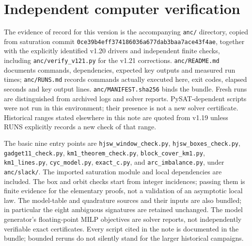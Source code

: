 \documentclass[11pt]{article}
\theoremstyle{remark}
\begin{document}
\section{Independent computer verification}

The evidence of record for this version is the accompanying \texttt{anc/} directory, copied from saturation commit
\texttt{0ce39b4eff374186036a677dab3baa7ace43f4ae}, together with the explicitly identified v1.20 drivers and independent finite checks, including \texttt{anc/verify\_v121.py} for the v1.21 corrections.
\texttt{anc/README.md} documents commands, dependencies, expected key outputs and measured run times;
\texttt{anc/RUNS.md} records commands actually executed here, exit codes, elapsed seconds and key output lines.
\texttt{anc/MANIFEST.sha256} binds the bundle.  Fresh runs are distinguished from archived logs and solver reports.
PySAT-dependent scripts were not run in this environment; their presence is not a new solver certificate.
Historical ranges stated elsewhere in this note are quoted from v1.19 unless RUNS explicitly records a new check of that range.

{\raggedright
The basic nine entry points are \texttt{hjsw\_\allowbreak window\_\allowbreak check.py}, \texttt{hjsw\_\allowbreak boxes\_\allowbreak check.py}, \texttt{gadget11\_check.py},
\texttt{km1\_\allowbreak theorem\_\allowbreak check.py}, \texttt{block\_\allowbreak cover\_\allowbreak km1.py}, \texttt{km1\_lines.py}, \texttt{cyc\_model.py},
\texttt{exact\_c.py}, and \texttt{arc\_imbalance.py}, under \texttt{anc/slack/}.
The imported saturation module and local dependencies are included.  The box and orbit checks start from integer incidences;
passing them is finite evidence for the elementary proofs, not a validation of an asymptotic local law.
The model-table and quadrature sources and their inputs are also bundled; in particular the eight ambiguous signatures are retained unchanged.
The model generator's floating-point MILP objectives are solver reports, not independently verifiable exact certificates.
Every script cited in the note is documented in the bundle; bounded reruns do not silently stand for the larger historical campaigns.
\par}
\end{document}

